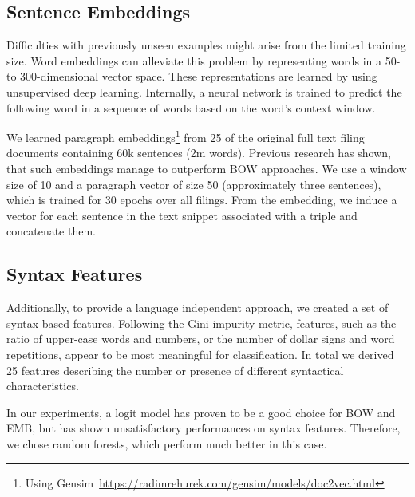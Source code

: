 \subsection{Sentence Embeddings}
Difficulties with previously unseen examples might arise from the limited training size.
Word embeddings can alleviate this problem by representing words in a 50- to 300-dimensional vector space.
These representations are learned by using unsupervised deep learning.
Internally, a neural network is trained to predict the following word in a sequence of words based on the word's context window. 

We learned paragraph embeddings\footnote{Using Gensim~\url{https://radimrehurek.com/gensim/models/doc2vec.html}} from 25 of the original full text filing documents containing 60k sentences (2m words).
Previous research has shown, that such embeddings manage to outperform BOW approaches\cite{embeddings}. 
We use a window size of 10 and a paragraph vector of size 50 (approximately three sentences), which is trained for 30 epochs over all filings.
From the embedding, we induce a vector for each sentence in the text snippet associated with a triple and concatenate them.

\subsection{Syntax Features}
Additionally, to provide a language independent approach, we created a set of syntax-based features.
Following the Gini impurity metric, features, such as the ratio of upper-case words and numbers, or the number of dollar signs and word repetitions, appear to be most meaningful for classification.
In total we derived 25 features describing the number or presence of different syntactical characteristics.

In our experiments, a logit model has proven to be a good choice for BOW and EMB, but has shown unsatisfactory performances on syntax features.
Therefore, we chose random forests, which perform much better in this case.

